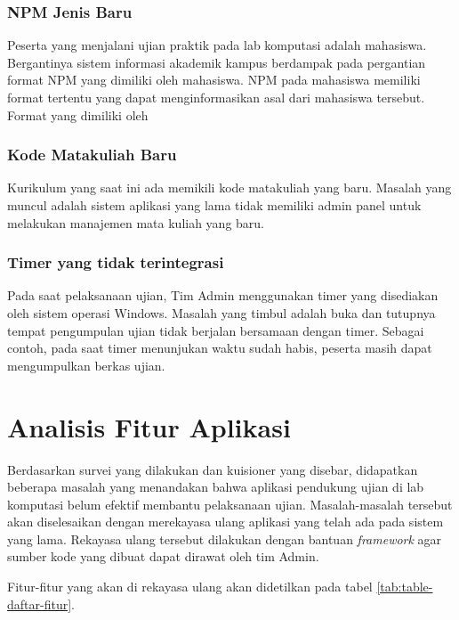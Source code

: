     \subsubsection{NPM Jenis Baru}\label{ref-prob-admin-npm-baru}
    Peserta yang menjalani ujian praktik pada lab komputasi adalah mahasiswa. Bergantinya sistem informasi akademik kampus berdampak pada pergantian format NPM yang dimiliki oleh mahasiswa. NPM pada mahasiswa memiliki format tertentu yang dapat menginformasikan asal dari mahasiswa tersebut.
    Format yang dimiliki oleh 
    
    \subsubsection{Kode Matakuliah Baru}\label{ref-prob-admin-kode-mk-baru}
    Kurikulum yang saat ini ada memikili kode matakuliah yang baru. Masalah yang muncul adalah sistem aplikasi yang lama tidak memiliki admin panel untuk melakukan manajemen mata kuliah yang baru.
    
    \subsubsection{Timer yang tidak terintegrasi}\label{ref-prob-admin-timer-integrated}
    Pada saat pelaksanaan ujian, Tim Admin menggunakan timer yang disediakan oleh sistem operasi Windows. Masalah yang timbul adalah buka dan tutupnya tempat pengumpulan ujian tidak berjalan bersamaan dengan timer. Sebagai contoh, pada saat timer menunjukan waktu sudah habis, peserta masih dapat mengumpulkan berkas ujian.
    
    
\section{Analisis Fitur Aplikasi}
    Berdasarkan survei yang dilakukan dan kuisioner yang disebar, didapatkan beberapa masalah yang menandakan bahwa aplikasi pendukung ujian di lab komputasi belum efektif membantu pelaksanaan ujian. Masalah-masalah tersebut akan diselesaikan dengan merekayasa ulang aplikasi yang telah ada pada sistem yang lama. Rekayasa ulang tersebut dilakukan dengan bantuan \textit{framework} agar sumber kode yang dibuat dapat dirawat oleh tim Admin.
    
    Fitur-fitur yang akan di rekayasa ulang akan didetilkan pada tabel \ref{tab:table-daftar-fitur}.
    
